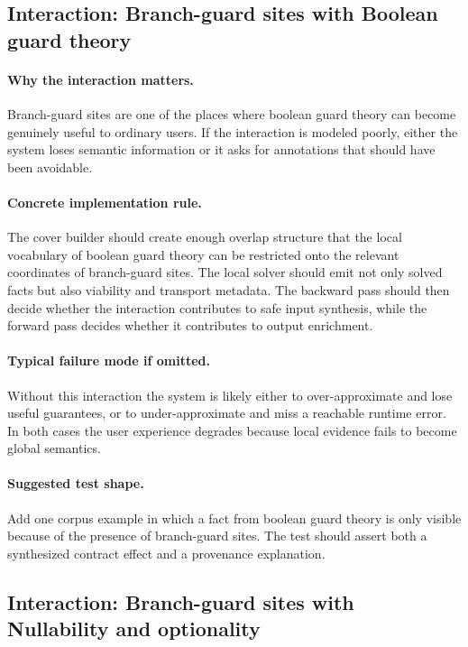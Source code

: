 \documentclass[11pt]{report}
\theoremstyle{definition}
\theoremstyle{plain}
\begin{document}
\subsection{Interaction: Branch-guard sites with Boolean guard theory}

\paragraph{Why the interaction matters.}
Branch-guard sites are one of the places where boolean guard theory can become
genuinely useful to ordinary users. If the interaction is modeled poorly,
either the system loses semantic information or it asks for annotations that
should have been avoidable.

\paragraph{Concrete implementation rule.}
The cover builder should create enough overlap structure that the local
vocabulary of boolean guard theory can be restricted onto the relevant
coordinates of branch-guard sites. The local solver should emit not only
solved facts but also viability and transport metadata. The backward pass
should then decide whether the interaction contributes to safe input
synthesis, while the forward pass decides whether it contributes to output
enrichment.

\paragraph{Typical failure mode if omitted.}
Without this interaction the system is likely either to over-approximate and
lose useful guarantees, or to under-approximate and miss a reachable runtime
error. In both cases the user experience degrades because local evidence
fails to become global semantics.

\paragraph{Suggested test shape.}
Add one corpus example in which a fact from boolean guard theory is only
visible because of the presence of branch-guard sites. The test should
assert both a synthesized contract effect and a provenance explanation.

\subsection{Interaction: Branch-guard sites with Nullability and optionality}
\end{document}
